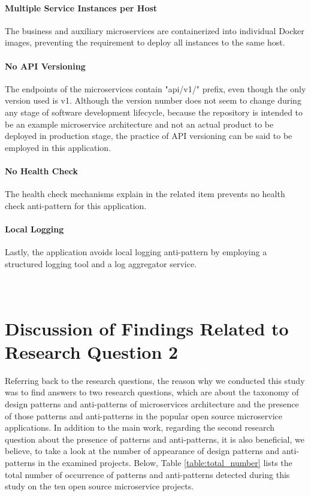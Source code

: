 \documentclass{Configuration_Files/PoliMi3i_thesis}
\begin{document}
\paragraph{Multiple Service Instances per Host} The business and auxiliary microservices are containerized into individual Docker images, preventing the requirement to deploy all instances to the same host.

\paragraph{No API Versioning} The endpoints of the microservices contain "api/v1/" prefix, even though the only version used is v1.
Although the version number does not seem to change during any stage of software development lifecycle, because the repository is intended to be an example microservice architecture and not an actual product to be deployed in production stage, the practice of API versioning can be said to be employed in this application.

\paragraph{No Health Check} The health check mechanisms explain in the related item prevents no health check anti-pattern for this application.

\paragraph{Local Logging} Lastly, the application avoids local logging anti-pattern by employing a structured logging tool and a log aggregator service.\\\\\\

\section{Discussion of Findings Related to Research Question 2}
\label{sec:discussion}

Referring back to the research questions, the reason why we conducted this study was to find answers to two research questions, which are about the taxonomy of design patterns and anti-patterns of microservices architecture and the presence of those patterns and anti-patterns in the popular open source microservice applications. 
In addition to the main work, regarding the second research question about the presence of patterns and anti-patterns, it is also beneficial, we believe, to take a look at the number of appearance of design patterns and anti-patterns in the examined projects.
Below, Table \ref{table:total_number} lists the total number of occurrence of patterns and anti-patterns detected during this study on the ten open source microservice projects.
\end{document}
